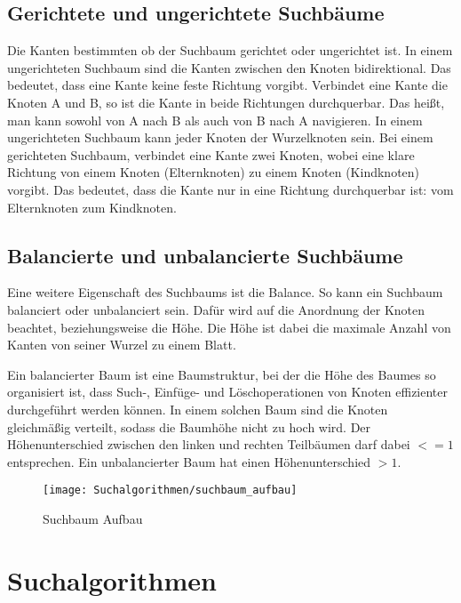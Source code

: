 \subsection{Gerichtete und ungerichtete Suchbäume}

Die Kanten bestimmten ob der Suchbaum gerichtet oder ungerichtet ist. In einem ungerichteten Suchbaum sind die Kanten zwischen den Knoten bidirektional. Das bedeutet, dass eine Kante keine feste Richtung vorgibt. Verbindet eine Kante die Knoten A und B, so ist die Kante in beide Richtungen durchquerbar. Das heißt, man kann sowohl von A nach B als auch von B nach A navigieren. In einem ungerichteten Suchbaum kann jeder Knoten der Wurzelknoten sein. Bei einem gerichteten Suchbaum, verbindet eine Kante zwei Knoten, wobei eine klare Richtung von einem Knoten (Elternknoten) zu einem Knoten (Kindknoten) vorgibt. Das bedeutet, dass die Kante nur in eine Richtung durchquerbar ist: vom Elternknoten zum Kindknoten.

\subsection{Balancierte und unbalancierte Suchbäume}

Eine weitere Eigenschaft des Suchbaums ist die Balance. So kann ein Suchbaum balanciert oder unbalanciert sein. Dafür wird auf die Anordnung der Knoten beachtet, beziehungsweise die Höhe. Die Höhe ist dabei die maximale Anzahl von Kanten von seiner Wurzel zu einem Blatt. 

Ein balancierter Baum ist eine Baumstruktur, bei der die Höhe des Baumes so organisiert ist, dass Such-, Einfüge- und Löschoperationen von Knoten effizienter durchgeführt werden können. In einem solchen Baum sind die Knoten gleichmäßig verteilt, sodass die Baumhöhe nicht zu hoch wird. Der Höhenunterschied zwischen den linken und rechten Teilbäumen darf dabei $<= 1$ entsprechen. Ein unbalancierter Baum hat einen Höhenunterschied $> 1$.

\begin{figure}[h]
  \centering
  \texttt{[image: Suchalgorithmen/suchbaum\_aufbau]}
	\captionsetup{justification=justified, format=plain}
  \caption{Suchbaum Aufbau}
  \label{Suchalgorithmen}
\end{figure}

\section{Suchalgorithmen}


